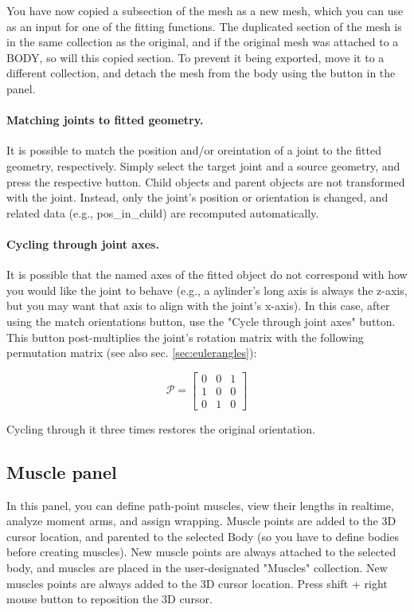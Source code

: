 \documentclass{article}
\begin{document}
You have now copied a subsection of the mesh as a new mesh, which you can use as an input for one of the fitting functions. The duplicated section of the mesh is in the same collection as the original, and if the original mesh was attached to a BODY, so will this copied section. To prevent it being exported, move it to a different collection, and detach the mesh from the body using the button in the panel.

\paragraph {Matching joints to fitted geometry.} 

It is possible to match the position and/or oreintation of a joint to the fitted geometry, respectively. Simply select the target joint and a source geometry, and press the respective button. Child objects and parent objects are not transformed with the joint. Instead, only the joint's position or orientation is changed, and related data (e.g., pos\_in\_child) are recomputed automatically. 

\paragraph {Cycling through joint axes.} 
It is possible that the named axes of the fitted object do not correspond with how you would like the joint to behave (e.g., a aylinder's long axis is always the z-axis, but you may want that axis to align with the joint's x-axis). In this case, after using the match orientations button, use the "Cycle through joint axes" button. This button post-multiplies the joint's rotation matrix with the following permutation matrix (see also sec. \ref{sec:eulerangles}):

\begin{equation}
\mathcal{P} =
\begin{bmatrix}
0 & 0 & 1 \\
1 & 0 & 0 \\
0 & 1 & 0
\end{bmatrix}
\end{equation}


Cycling through it three times restores the original orientation.

\subsection{Muscle panel}

In this panel, you can define path-point muscles, view their lengths in realtime, analyze moment arms, and assign wrapping. Muscle points are added to the 3D cursor location, and parented to the selected Body (so you have to define bodies before creating muscles). New muscle points are always attached to the selected body, and muscles are placed in the user-designated "Muscles" collection. New muscles points are always added to the 3D cursor location. Press shift + right mouse button to reposition the 3D cursor. 
\end{document}
